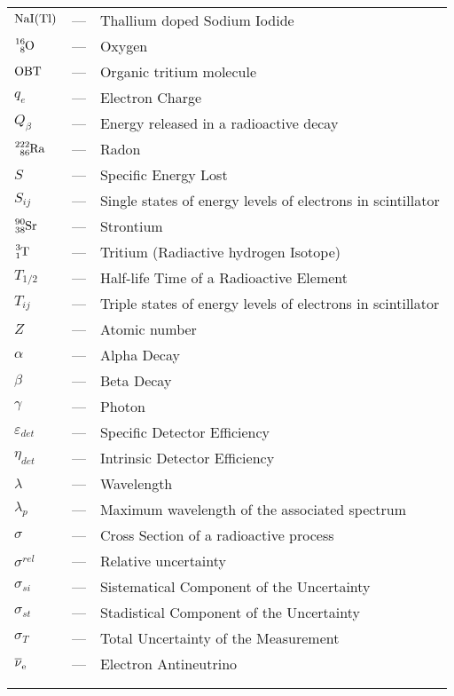 \begin{longtable}{p{25mm} c p{120mm} }
$\ce{NaI(Tl)}$ & --- & Thallium doped Sodium Iodide\\
$\ce{^{16}_{8}O}$ & --- & Oxygen\\
$\ce{OBT}$ & --- & Organic tritium molecule\\
$q_{e}$ & --- & Electron Charge\\
$Q_\beta$ & --- & Energy released in a radioactive decay\\
$\ce{^{222}_{86}Ra}$ & --- & Radon\\
$S$ & --- & Specific Energy Lost\\
$S_{ij}$ & --- & Single states of energy levels of electrons in scintillator\\
$\ce{^{90}_{38}Sr}$ & --- & Strontium\\
$\ce{^{3}_{1}T}$ & --- & Tritium (Radiactive hydrogen Isotope)\\
$T_{1/2}$ & --- & Half-life Time of a Radioactive Element\\
$T_{ij}$ & --- & Triple states of energy levels of electrons in scintillator\\
$Z$ & --- & Atomic number\\
$\alpha$ & --- & Alpha Decay\\
$\beta$ & --- & Beta Decay\\
$\gamma$ & --- & Photon\\
$\varepsilon_{det}$ & --- & Specific Detector Efficiency\\
$\eta_{det}$ & --- & Intrinsic Detector Efficiency\\
$\lambda$ & --- & Wavelength\\
$\lambda_p$ & --- & Maximum wavelength of the
\newline associated spectrum\\
$\sigma$ & --- & Cross Section of a radioactive process\\
$\sigma^{rel}$ & --- & Relative uncertainty\\
$\sigma_{si}$ & --- & Sistematical Component of the Uncertainty\\
$\sigma_{st}$ & --- & Stadistical Component of the Uncertainty\\
$\sigma_{T}$ & --- & Total Uncertainty of the Measurement\\
$\ce{\overline{\nu}_e}$ & --- & Electron Antineutrino\\
\\
\\


\end{longtable}
